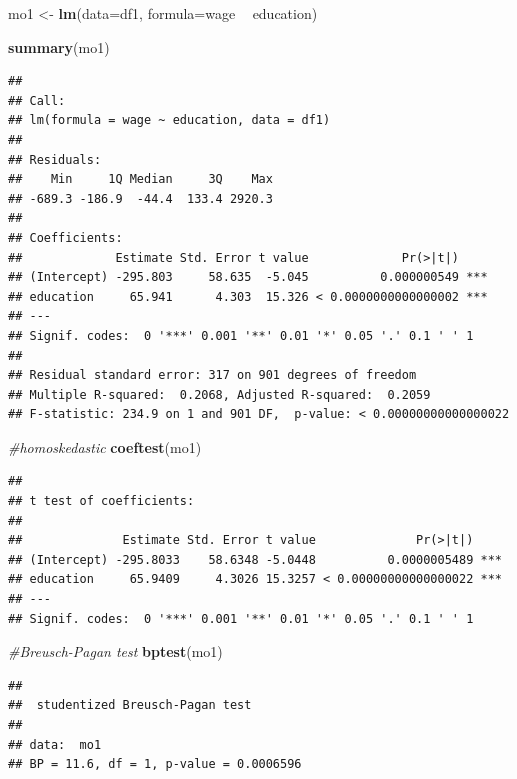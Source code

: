 \documentclass[
]{book}
\newenvironment{Shaded}{\begin{snugshade}}{\end{snugshade}}
\newcommand{\CommentTok}[1]{\textcolor[rgb]{0.56,0.35,0.01}{\textit{#1}}}
\newcommand{\DataTypeTok}[1]{\textcolor[rgb]{0.13,0.29,0.53}{#1}}
\newcommand{\KeywordTok}[1]{\textcolor[rgb]{0.13,0.29,0.53}{\textbf{#1}}}
\newcommand{\NormalTok}[1]{#1}
\newcommand{\OperatorTok}[1]{\textcolor[rgb]{0.81,0.36,0.00}{\textbf{#1}}}
\newcommand{\StringTok}[1]{\textcolor[rgb]{0.31,0.60,0.02}{#1}}
\begin{document}
\begin{Shaded}
\begin{Highlighting}[]
\NormalTok{mo1 <-}\StringTok{ }\KeywordTok{lm}\NormalTok{(}\DataTypeTok{data=}\NormalTok{df1, }\DataTypeTok{formula=}\NormalTok{wage }\OperatorTok{~}\StringTok{ }\NormalTok{education)}

\KeywordTok{summary}\NormalTok{(mo1)}
\end{Highlighting}
\end{Shaded}

\begin{verbatim}
## 
## Call:
## lm(formula = wage ~ education, data = df1)
## 
## Residuals:
##    Min     1Q Median     3Q    Max 
## -689.3 -186.9  -44.4  133.4 2920.3 
## 
## Coefficients:
##             Estimate Std. Error t value             Pr(>|t|)    
## (Intercept) -295.803     58.635  -5.045          0.000000549 ***
## education     65.941      4.303  15.326 < 0.0000000000000002 ***
## ---
## Signif. codes:  0 '***' 0.001 '**' 0.01 '*' 0.05 '.' 0.1 ' ' 1
## 
## Residual standard error: 317 on 901 degrees of freedom
## Multiple R-squared:  0.2068, Adjusted R-squared:  0.2059 
## F-statistic: 234.9 on 1 and 901 DF,  p-value: < 0.00000000000000022
\end{verbatim}

\begin{Shaded}
\begin{Highlighting}[]
\CommentTok{#homoskedastic}
\KeywordTok{coeftest}\NormalTok{(mo1)}
\end{Highlighting}
\end{Shaded}

\begin{verbatim}
## 
## t test of coefficients:
## 
##              Estimate Std. Error t value              Pr(>|t|)    
## (Intercept) -295.8033    58.6348 -5.0448          0.0000005489 ***
## education     65.9409     4.3026 15.3257 < 0.00000000000000022 ***
## ---
## Signif. codes:  0 '***' 0.001 '**' 0.01 '*' 0.05 '.' 0.1 ' ' 1
\end{verbatim}

\begin{Shaded}
\begin{Highlighting}[]
\CommentTok{#Breusch-Pagan test }
\KeywordTok{bptest}\NormalTok{(mo1)}
\end{Highlighting}
\end{Shaded}

\begin{verbatim}
## 
##  studentized Breusch-Pagan test
## 
## data:  mo1
## BP = 11.6, df = 1, p-value = 0.0006596
\end{verbatim}
\end{document}
